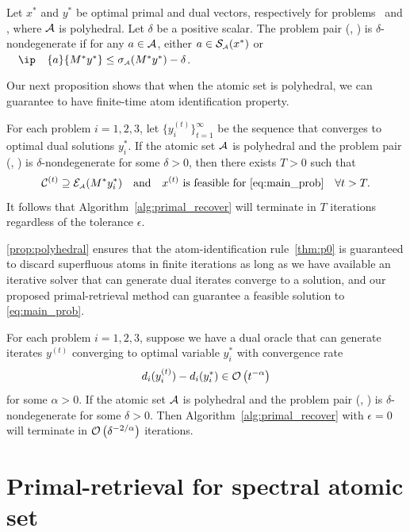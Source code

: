 \begin{definition}
    Let $x^*$ and $y^*$ be optimal primal and dual vectors, respectively for
    problems \Probi\ and \Drobi, where $\mathcal{A}$ is polyhedral. Let $\delta$ be a positive scalar. 
    The problem pair (\Probi, \Drobi) is $\delta$-nondegenerate if for any $a\in\mathcal{A}$, either $a\in\operatorname{\mathcal{S}_{\scriptscriptstyle\mathcal{A}}}(x^*)$ or $\ip{a}{M^*y^*} \leq \sigma\As(M^*y^*) - \delta$. 
\end{definition}

Our next proposition shows that when the atomic set is polyhedral, we can guarantee to have finite-time atom identification property. 

\begin{proposition} \label{prop:polyhedral} For each problem $i
    = 1, 2, 3$, let $\{y_i^{(t)}\}_{t=1}^\infty$
    be the sequence that converges to optimal dual solutions $
    y_i^*$. If the atomic set $\mathcal{A}$ is polyhedral and the problem pair (\Probi, \Drobi) is $\delta$-nondegenerate for some $\delta > 0$,
    then there exists
    $T > 0$ such that 
    \[\mathcal{C}^{(t)} \supseteq \mathcal{E}_{\scriptscriptstyle\mathcal{A}}( M^* y_i^*) 
    \hbox{\quad and\quad}
    x^{(t)} \mbox{ is feasible for } \eqref{eq:main_prob} 
    \quad \forall t>T.\]
    It follows that Algorithm~\ref{alg:primal_recover} will terminate in $T$ iterations regardless of the tolerance $\epsilon$. 
\end{proposition}

\autoref{prop:polyhedral} ensures that the atom-identification rule~\autoref{thm:p0} is guaranteed to discard superfluous atoms in finite iterations as long as we have available an iterative solver that can generate dual iterates converge to a solution, and  our proposed primal-retrieval method can guarantee a feasible solution to \eqref{eq:main_prob}. 

\begin{corollary} \label{coro:polyhedral}
    For each problem $i= 1, 2, 3$, suppose we have a dual oracle that can generate iterates $y^{(t)}$ converging to optimal variable $y_i^*$ with convergence rate
    \[d_i(y_i^{(t)}) - d_i(y_i^*) \in \mathcal{O}\left( t^{-\alpha} \right)\]
    for some $\alpha > 0$. If the atomic set $\mathcal{A}$ is polyhedral and the problem pair (\Probi, \Drobi) is $\delta$-nondegenerate for some $\delta > 0$. Then Algorithm~\ref{alg:primal_recover} with $\epsilon=0$ will terminate in $\mathcal{O}\left(\delta^{-2/\alpha}\right)$ iterations. 
\end{corollary}

\section{Primal-retrieval for spectral atomic set} \label{sec:spectral}

